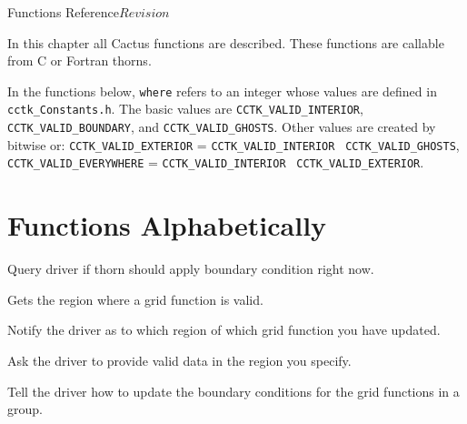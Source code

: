 \begin{cactuspart}{ Functions Reference}{}{$Revision$}
\label{part:DriverReference}
\renewcommand{\thepage}{\Alph{part}\arabic{page}}

In this chapter all  Cactus functions are described.
These functions are callable from C or Fortran thorns.

In the functions below, \texttt{where} refers to an integer whose values are defined in \texttt{cctk\_Constants.h}. The basic values are \texttt{CCTK\_VALID\_INTERIOR}, \texttt{CCTK\_VALID\_BOUNDARY}, and \texttt{CCTK\_VALID\_GHOSTS}. Other values are created by bitwise or: \texttt{CCTK\_VALID\_EXTERIOR} = \texttt{CCTK\_VALID\_INTERIOR} \textbar~\texttt{CCTK\_VALID\_GHOSTS}, \texttt{CCTK\_VALID\_EVERYWHERE} = \texttt{CCTK\_VALID\_INTERIOR} \textbar~\texttt{CCTK\_VALID\_EXTERIOR}.


\chapter{Functions Alphabetically}

\begin{Lentry}

\item[\code{Driver\_FilterOutVarForBCI}] [\pageref{Driver-FilterOutVarForBCI}]
Query driver if  thorn should apply boundary condition right
now.

\item[\code{Driver\_GetValidRegion}] [\pageref{Driver-GetValidRegion}]
Gets the region where a grid function is valid.

\item[\code{CCTK\_NotifyDataModified}] [\pageref{CCTK-gNotifyDataModified}]
Notify the driver as to which region of which grid function you have updated.

\item[\code{CCTK\_RequireValidData}] [\pageref{CCTK-gRequireValidData}]
Ask the driver to provide valid data in the region you specify.

\item[\code{CCTK\_SelectGroupForBC}] [\pageref{CCTK-gSelectGroupForBC}]
Tell the driver how to update the boundary conditions for the grid functions in a group.


\end{Lentry}
\end{cactuspart}
